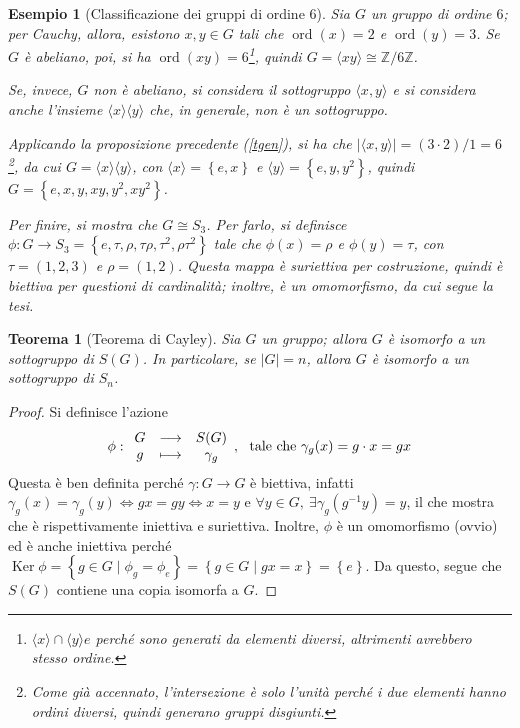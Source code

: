 \documentclass[12pt]{scrartcl}
\theoremstyle{style}
\newtheorem{esempio}{Esempio}[section]
\newtheorem{teorema}{Teorema}[section]
\numberwithin{equation}{subsection}
\begin{document}
\begin{esempio}[Classificazione dei gruppi di ordine 6]
Sia $G$ un gruppo di ordine $6$; per Cauchy, allora, esistono $x,y \in G$ tali che $\operatorname{ord}(x) = 2$ e $\operatorname{ord}(y) =3$. 
Se $G$ \`e abeliano, poi, si ha $\operatorname{ord}(xy) = 6$\footnote{$\langle x \rangle \cap \langle y \rangle e$ perch\'e sono generati da elementi diversi, altrimenti avrebbero stesso ordine.}, quindi $G = \langle xy \rangle\cong \mathbb{Z}/ 6\mathbb{Z}$.

Se, invece, $G$ non \`e abeliano, si considera il sottogruppo $\langle x,y \rangle$ e si considera anche l'insieme $\langle x \rangle\langle y \rangle$ che, in generale, non \`e un sottogruppo.

Applicando la proposizione precedente (\ref{tgen}), si ha che $\lvert \langle x,y \rangle \rvert = (3 \cdot 2) / 1= 6$\footnote{Come gi\`a accennato, l'intersezione \`e solo l'unit\`a perch\'e i due elementi hanno ordini diversi, quindi generano gruppi disgiunti.}, da cui $G = \langle x \rangle\langle y \rangle$, con $\langle x \rangle= \left\{ e,x \right\} $ e $\langle y \rangle= \left\{ e,y,y^2 \right\} $, quindi $G = \left\{ e , x ,y, xy,y^2 , xy^2 \right\} $.

Per finire, si mostra che $G \cong S_3$. 
Per farlo, si definisce $\phi :G \to S_3=\left\{ e,\tau ,\rho ,\tau \rho ,\tau ^2,\rho \tau ^2 \right\} $ tale che $\phi (x) = \rho $ e $\phi (y) = \tau $, con $\tau =(1,2,3)$ e $\rho = (1,2)$.
Questa mappa \`e suriettiva per costruzione, quindi \`e biettiva per questioni di cardinalit\`a; inoltre, \`e un omomorfismo, da cui segue la tesi.
\end{esempio}

\begin{teorema}
	[Teorema di Cayley]
	Sia $G$ un gruppo; allora $G$ \`e isomorfo a un sottogruppo di $S(G)$.
	In particolare, se $|G| = n$, allora $G$ \`e isomorfo a un sottogruppo di $S_n$.
\end{teorema}
	\begin{proof}
		Si definisce l'azione
		\[
		\phi : 
		\begin{array}
			{c c c}
			G & \longrightarrow & S(G)\\
			g & \longmapsto & \gamma_g
		\end{array}, \ \text{ tale che } \gamma_g(x) = g\cdot  x=gx
		\] 
		Questa \`e ben definita perch\'e $\gamma:G \to G$ \`e biettiva, infatti $\gamma_g(x) = \gamma_g(y) \iff g x = g y \iff x = y$ e $\forall y \in G , \ \exists \gamma_g(g^{-1} y) = y $, il che mostra che \`e rispettivamente iniettiva e suriettiva.
		Inoltre, $\phi $ \`e un omomorfismo (ovvio) ed \`e anche iniettiva perch\'e $\operatorname{Ker} \phi = \left\{ g \in G  \mid \phi _g = \phi _e \right\} = \left\{ g \in G  \mid g x = x \right\} = \left\{ e \right\}$.
		Da questo, segue che $S(G)$ contiene una copia isomorfa a $G$.
	\end{proof}
\end{document}
